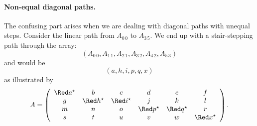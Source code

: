 \paragraph{Non-equal diagonal paths.}
The confusing part arises when we are dealing with diagonal paths with unequal steps.
Consider the linear path from $A_{0\,0}$ to $A_{3\,5}$.
We end up with a stair-stepping path through the array:
$$\left(A_{0\,0}, A_{1\,1}, A_{2\,1}, A_{3\,2}, A_{4\,2}, A_{5\,3}\right)$$
and would be
$$\left(a, h, i, p, q, x\right)$$
as illustrated by
$$A = \left(\begin{array}{cccccc}
\apmk a & b & c & d & e & f \\
g & \apmk h & \apmk i & j & k & l \\
m & n & o & \apmk p & \apmk q & r \\
s & t & u & v & w & \apmk x
\end{array}\right).$$

